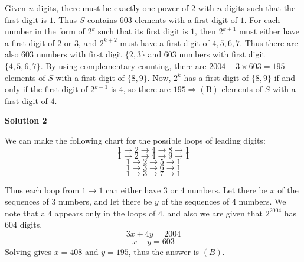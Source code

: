 \begin{enumerate}
Given $n$ digits, there must be exactly one power of $2$ with $n$ digits such that the first digit is $1$. Thus $S$ contains $603$ elements with a first digit of $1$. For each number in the form of $2^k$ such that its first digit is $1$, then $2^{k+1}$ must either have a first digit of $2$ or $3$, and $2^{k+2}$ must have a first digit of $4,5,6,7$. Thus there are also $603$ numbers with first digit $\{2,3\}$ and $603$ numbers with first digit $\{4,5,6,7\}$. By using \href{https://artofproblemsolving.com/wiki/index.php?title=Complementary\_counting}{complementary counting}, there are $2004 - 3 \times 603 = 195$ elements of $S$ with a first digit of $\{8,9\}$. Now, $2^k$ has a first digit of $\{8,9\}$ \href{https://artofproblemsolving.com/wiki/index.php?title=Iff}{if and only if} the first digit of $2^{k-1}$ is $4$, so there are $\boxed{195} \Rightarrow \mathrm{(B)}$ elements of $S$ with a first digit of $4$.

 



\textbf{Solution 2}

We can make the following chart for the possible loops of leading digits:
 \[1 \rightarrow 2 \rightarrow 4 \rightarrow 8 \rightarrow 1\]
 \[1 \rightarrow 2 \rightarrow 4 \rightarrow 9 \rightarrow 1\]
 \[1 \rightarrow 2 \rightarrow 5 \rightarrow 1\]
 \[1 \rightarrow 3 \rightarrow 6 \rightarrow 1\]
 \[1 \rightarrow 3 \rightarrow 7 \rightarrow 1\]

 
Thus each loop from $1 \rightarrow 1$ can either have $3$ or $4$ numbers. Let there be $x$ of the sequences of $3$ numbers, and let there be $y$ of the sequences of $4$ numbers. We note that a $4$ appears only in the loops of $4$, and also we are given that $2^{2004}$ has $604$ digits.
 \[3x+4y=2004\]
 \[x+y=603\]Solving gives $x = 408$ and $y = 195$, thus the answer is $(B)$.

 


\end{enumerate}
